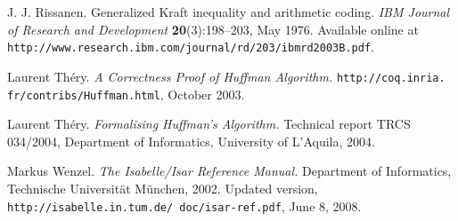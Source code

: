 \documentclass[11pt,a4paper]{article}
\begin{document}
\begin{thebibliography}{[9]}
 J. J. Rissanen.
Generalized Kraft inequality and arithmetic coding. {\sl IBM
Journal of Research and Development\/} {\bf 20}(3):198--203, May 1976.
Available online at
{\tt http://www.research.ibm.com/journal/rd/203/ibmrd2003B.pdf}.

 Laurent Th\'ery. {\sl A Correctness Proof of Huffman
Algorithm.} {\tt http://\allowbreak coq.\allowbreak inria.\allowbreak
fr/\allowbreak contribs/Huffman.html}, October 2003.

 Laurent Th\'ery. {\sl Formalising Huffman's Algorithm.}
Technical report TRCS 034/2004, Department of Informatics, University of
L'Aquila, 2004.

 Markus Wenzel. {\sl The Isabelle/Isar Reference Manual.}
Department of Informatics, Technische Universit\"at M\"unchen, 2002. Updated
version, {\tt http://\allowbreak isabelle.in.tum.de/\allowbreak
doc/isar-ref.pdf}, June 8, 2008.

\end{thebibliography}
\end{document}
